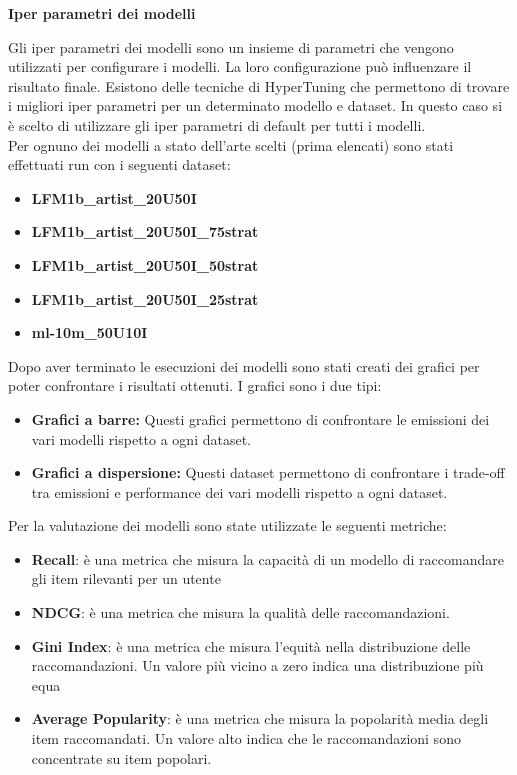 \noindent \textbf{Iper parametri dei modelli}


\noindent Gli iper parametri dei modelli sono un insieme di parametri che vengono utilizzati per configurare i modelli. La loro configurazione può influenzare il risultato finale. Esistono delle tecniche di HyperTuning che permettono di trovare i migliori iper parametri per un determinato modello e dataset.
In questo caso si è scelto di utilizzare gli iper parametri di default per tutti i modelli.\\Per ognuno dei modelli a stato dell'arte scelti (prima elencati) sono stati effettuati run con i seguenti dataset:
\begin{itemize}
    \item \textbf{LFM1b\_artist\_20U50I}
    \item \textbf{LFM1b\_artist\_20U50I\_75strat}
    \item \textbf{LFM1b\_artist\_20U50I\_50strat}
    \item \textbf{LFM1b\_artist\_20U50I\_25strat}
    \item \textbf{ml-10m\_50U10I}
\end{itemize}

\noindent Dopo aver terminato le esecuzioni dei modelli sono stati creati dei grafici per poter confrontare i risultati ottenuti. I grafici sono i due tipi:
\begin{itemize}
    \item \textbf{Grafici a barre:} Questi grafici permettono di confrontare le emissioni dei vari modelli rispetto a ogni dataset.
    \item \textbf{Grafici a dispersione:} Questi dataset permettono di confrontare i trade-off tra emissioni e performance dei vari modelli rispetto a ogni dataset.
\end{itemize}

\noindent Per la valutazione dei modelli sono state utilizzate le seguenti metriche:
\begin{itemize}
    \item \textbf{Recall}: è una metrica che misura la capacità di un modello di raccomandare gli item rilevanti per un utente
    \item \textbf{NDCG}: è una metrica che misura la qualità delle raccomandazioni.
    \item \textbf{Gini Index}: è una metrica che misura l'equità nella distribuzione delle raccomandazioni. Un valore più vicino a zero indica una distribuzione più equa
    \item \textbf{Average Popularity}: è una metrica che misura la popolarità media degli item raccomandati. Un valore alto indica che le raccomandazioni sono concentrate su item popolari.
\end{itemize}



